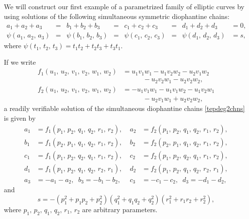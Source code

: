 \documentclass[11pt, leqno]{article}
\begin{document}
\subsection{}
We will  construct our first example of a parametrized family of elliptic curves by using solutions of the following simultaneous symmetric diophantine chains:
\begin{equation}
\begin{aligned}
a_1+a_2+a_3&=&b_1+b_2+b_3&=&c_1+c_2+c_3&=&d_1+d_2+d_3&=0,\\
\psi(a_1,\,a_2,\,a_3)&=&\psi(b_1,\,b_2,\,b_3)&=&\psi(c_1,\,c_2,\,c_3)&=&\psi(d_1,\,d_2,\,d_3)&=s,
\end{aligned}
\label{tepdeg2chns}
\end{equation}
where $\psi(t_1,\,t_2,\,t_3)=t_1t_2+t_2t_3+t_3t_1$. 

If we write
\begin{equation}
\begin{aligned}
f_1(u_1,\,u_2,\,v_1,\,v_2,\,w_1,\,w_2)&=u_1v_1w_1-u_1v_2w_2-u_2v_1w_2\\
& \quad \quad \quad -u_2v_2w_1-u_2v_2w_2,\\
f_2(u_1,\,u_2,\,v_1,\,v_2,\,w_1,\,w_2)&=-u_1v_1w_1-u_1v_1w_2-u_1v_2w_1\\
& \quad \quad \quad -u_2v_1w_1+u_2v_2w_2,
\end{aligned}
\label{deffuvw}
\end{equation}
a readily verifiable solution of the simultaneous diophantine chains \eqref{tepdeg2chns} is given by
\begin{equation}
\begin{aligned}
a_1&=f_1(p_1,\,p_2,\,q_1,\,q_2,\,r_1,\,r_2),\;&a_2&=f_2(p_1,\,p_2,\,q_1,\,q_2,\,r_1,\,r_2),\\
b_1&=f_1(p_2,\,p_1,\,q_1,\,q_2,\,r_1,\,r_2),\;&b_2&=f_2(p_2,\,p_1,\,q_1,\,q_2,\,r_1,\,r_2),\\
c_1&=f_1(p_1,\,p_2,\,q_2,\,q_1,\,r_1,\,r_2),\;&c_2&=f_2(p_1,\,p_2,\,q_2,\,q_1,\,r_1,\,r_2),\\
d_1&=f_1(p_1,\,p_2,\,q_1,\,q_2,\,r_2,\,r_1),\;&d_2&=f_2(p_1,\,p_2,\,q_1,\,q_2,\,r_2,\,r_1),\\
a_3&=-a_1-a_2,\;\;b_3=-b_1-b_2,&c_3&=-c_1-c_2,\;\;d_3=-d_1-d_2,
\end{aligned}
\label{soltepdeg2chns}
\end{equation}
and
\begin{equation}
s=-(p_1^2+p_1p_2+p_2^2)(q_1^2+q_1q_2+q_2^2)(r_1^2+r_1r_2+r_2^2),
\end{equation}
where $p_1,\,p_2,\,q_1,\,q_2,\,r_1,\,r_2$ are arbitrary  parameters.
\end{document}
